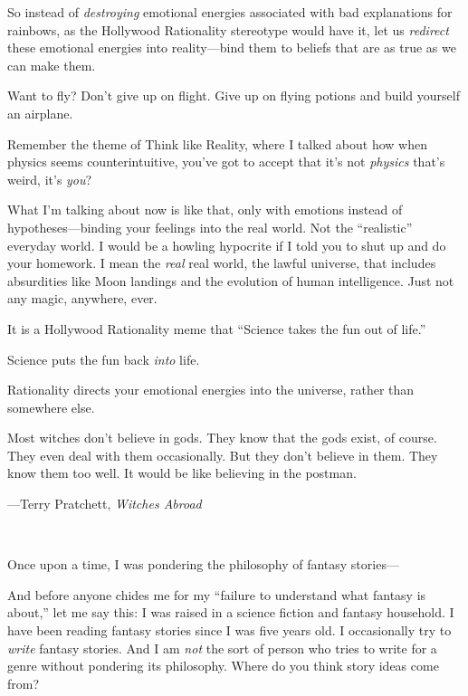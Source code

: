 {
 So instead of \textit{destroying} emotional energies associated
with bad explanations for rainbows, as the Hollywood Rationality
stereotype would have it, let us \textit{redirect} these emotional
energies into reality---bind them to beliefs that are as true as we can
make them.}

{
 Want to fly? Don't give up on flight. Give up on
flying potions and build yourself an airplane.}

{
 Remember the theme of Think like Reality, where I talked about how
when physics seems counterintuitive, you've got to
accept that it's not \textit{physics}
that's weird, it's \textit{you}?}

{
 What I'm talking about now is like that, only with
emotions instead of hypotheses---binding your feelings into the real
world. Not the ``realistic''
everyday world. I would be a howling hypocrite if I told you to shut up
and do your homework. I mean the \textit{real} real world, the lawful
universe, that includes absurdities like Moon landings and the
evolution of human intelligence. Just not any magic, anywhere, ever.}

{
 It is a Hollywood Rationality meme that ``Science
takes the fun out of life.''}

{
 Science puts the fun back \textit{into} life.}

{
 Rationality directs your emotional energies into the universe,
rather than somewhere else.}

\myendsectiontext


{
 Most witches don't believe in gods. They know that
the gods exist, of course. They even deal with them occasionally. But
they don't believe in them. They know them too well. It
would be like believing in the postman.}

{\raggedleft
 {}---Terry Pratchett, \textit{Witches Abroad}
\par}


\bigskip

{
 ~}

{
 Once upon a time, I was pondering the philosophy of fantasy
stories---}

{
 And before anyone chides me for my ``failure to
understand what fantasy is about,'' let me say this:
I was raised in a science fiction and fantasy household. I have been
reading fantasy stories since I was five years old. I occasionally try
to \textit{write} fantasy stories. And I am \textit{not} the sort of
person who tries to write for a genre without pondering its philosophy.
Where do you think story ideas come from?}

